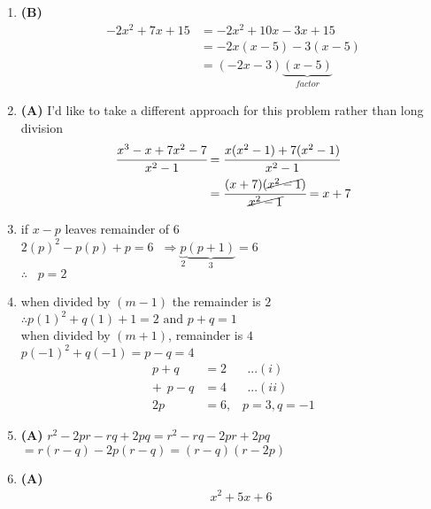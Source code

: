 \begin{multicols}{2}
\begin{enumerate}[label={\textbf{\arabic*.}}]
    \item\textbf{(B)} \begin{align*}
        -2x^2 + 7x + 15 &= -2x^2 + 10x - 3x + 15 \\
        & = -2x(x -5) -3(x-5) \\
        & = (-2x -3)\underbrace{(x-5)}_{factor}
    \end{align*}
    
    \item \textbf{(A)} I'd like to take a different approach for this problem rather than long division \\
    \begin{align*} 
        \cfrac{x^3 - x  + 7x^2 - 7}{x^2 - 1} & = \cfrac{x(x^2 -1) + 7(x^2 -1)}{x^2 - 1}  \\
        & = \cfrac{(x+7)(\cancel{x^2 - 1})}{\cancel{x^2 -1}} = x+7
    \end{align*}
    \item if $x-p$ leaves remainder of 6  \\
    $2(p)^2 -p(p) + p = 6 \hspace{7pt} \Rightarrow  \underbrace{p}_{2} \underbrace{(p+1)}_{3} = 6$ \\
    $\therefore \hspace{10pt} p = 2$
    \item when divided by $(m-1)$ the remainder is $2$ \\
    $\therefore p(1)^2 + q(1) + 1 = 2 \text{ and } p + q = 1$\\
    when divided by $(m+1)$, remainder is $4$ \\
    $p(-1)^2 + q(-1) = p -q = 4$
    \begin{align*} 
        p + q &= 2 \hspace{20pt} ...(i) \\
       +\hspace{5pt}  p - q &= 4 \hspace{20pt} ...(ii) \\
       2p & = 6, \hspace{10pt} p = 3, q = -1
    \end{align*}
\item \textbf{(A)} 
    \(r^2 - 2pr - rq + 2pq = r^2 - rq - 2pr + 2pq \)\\
    \(= r(r - q) - 2p(r - q) = (r - q)(r - 2p)\)    
\item \textbf{(A)} 
        \begin{align*}
            & \hspace{5pt} x^2 + 5x + 6 \\

\end{align*}
\end{enumerate}
\end{multicols}
